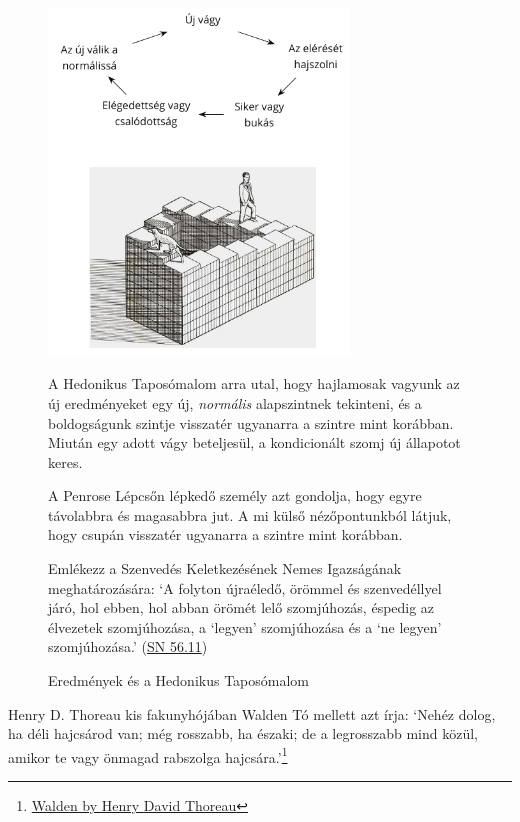 \begin{figure}[h]
\caption{Eredmények és a Hedonikus Taposómalom}\label{fig-hedonic-treadmill}

\centering

\includegraphics[width=80mm]{./manuscript/tex/diagrams/hedonic-treadmill-stairs-hu.pdf}

\bigskip

{\small

A Hedonikus Taposómalom arra utal,
hogy hajlamosak vagyunk az új eredményeket egy új, \emph{normális} alapszintnek tekinteni,
és a boldogságunk szintje visszatér ugyanarra a szintre mint korábban.
Miután egy adott vágy beteljesül, a kondicionált szomj új állapotot keres.

\bigskip

A Penrose Lépcsőn lépkedő személy azt gondolja,
hogy egyre távolabbra és magasabbra jut.
A mi külső nézőpontunkból látjuk,
hogy csupán visszatér ugyanarra a szintre mint korábban.

Emlékezz a Szenvedés Keletkezésének Nemes Igazságának meghatározására:
`A folyton újraéledő, örömmel és szenvedéllyel járó, hol ebben, hol abban örömét lelő szomjúhozás, éspedig az élvezetek szomjúhozása, a ‘legyen’ szomjúhozása és a ‘ne legyen’ szomjúhozása.'
(\href{https://a-buddha-ujja.hu/sn-56.11/hu/a-pali-fordito-csoport}{SN 56.11})

}

\end{figure}


\clearpage

Henry D. Thoreau kis fakunyhójában Walden Tó mellett azt írja: `Nehéz
dolog, ha déli hajcsárod van; még rosszabb, ha északi; de a legrosszabb
mind közül, amikor te vagy önmagad rabszolga hajcsára.'\footnote{\href{https://www.goodreads.com/book/show/16902.Walden}{Walden
  by Henry David Thoreau}}


